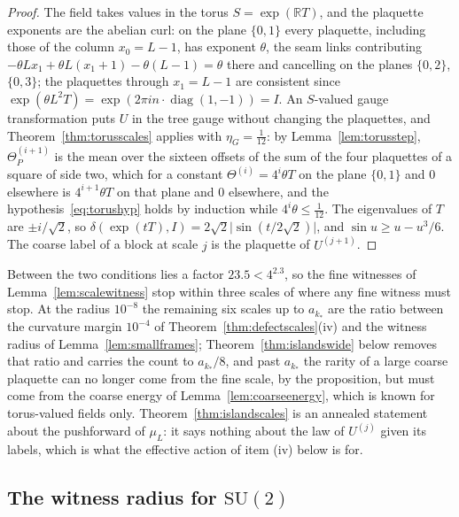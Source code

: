 \documentclass[11pt]{amsart}
\theoremstyle{definition}
\theoremstyle{remark}
\numberwithin{equation}{section}
\newcommand{\R}{\mathbb{R}}
\newcommand{\SU}{\mathrm{SU}}
\begin{document}
\begin{proof}
The field takes values in the torus $S=\exp(\R T)$, and the plaquette
exponents are the abelian curl: on the plane $\{0,1\}$ every plaquette,
including those of the column $x_0=L-1$, has exponent $\theta$, the seam
links contributing $-\theta Lx_1+\theta L(x_1+1)-\theta(L-1)=\theta$ there
and cancelling on the planes $\{0,2\}$, $\{0,3\}$; the plaquettes through
$x_1=L-1$ are consistent since $\exp(\theta L^2T)=\exp(2\pi in\cdot
\operatorname{diag}(1,-1))=I$. An $S$-valued gauge transformation puts $U$
in the tree gauge without changing the plaquettes, and
Theorem~\ref{thm:torusscales} applies with $\eta_G=\frac1{12}$: by
Lemma~\ref{lem:torusstep}, $\Theta^{(i+1)}_P$ is the mean over the sixteen
offsets of the sum of the four plaquettes of a square of side two, which
for a constant $\Theta^{(i)}=4^i\theta T$ on the plane $\{0,1\}$ and $0$
elsewhere is $4^{i+1}\theta T$ on that plane and $0$ elsewhere, and the
hypothesis~\eqref{eq:torushyp} holds by induction while $4^i\theta\le
\frac1{12}$. The eigenvalues of $T$ are $\pm i/\sqrt2$, so $\delta(\exp(tT),
I)=2\sqrt2\lvert\sin(t/2\sqrt2)\rvert$, and $\sin u\ge u-u^3/6$. The
coarse label of a block at scale $j$ is the plaquette of $U^{(j+1)}$.
\end{proof}

Between the two conditions lies a factor $23.5<4^{2.3}$, so the fine
witnesses of Lemma~\ref{lem:scalewitness} stop within three scales of
where any fine witness must stop. At the radius $10^{-8}$ the remaining
six scales up to $a_{k_*}$ are the ratio between the curvature margin
$10^{-4}$ of Theorem~\ref{thm:defectscales}(iv) and the witness radius of
Lemma~\ref{lem:smallframes}; Theorem~\ref{thm:islandswide} below removes
that ratio and carries the count to $a_{k_*}/8$, and past $a_{k_*}$ the rarity of a large coarse
plaquette can no longer come from the fine scale, by the proposition, but
must come from the coarse energy of Lemma~\ref{lem:coarseenergy}, which is
known for torus-valued fields only. Theorem~\ref{thm:islandscales} is an
annealed statement about the pushforward of $\mu_L$: it says nothing about
the law of $U^{(j)}$ given its labels, which is what the effective action
of item (iv) below is for.

\subsection{The witness radius for $\SU(2)$}\label{ssec:witnessradius}
\end{document}
